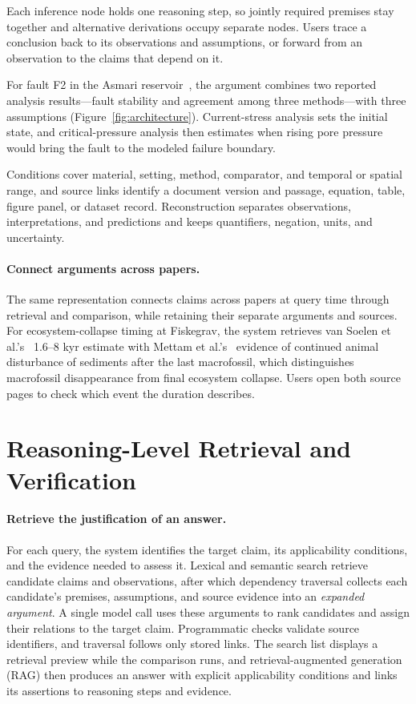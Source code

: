 \documentclass[sigconf,screen,review]{acmart}
\begin{document}
Each inference node holds one reasoning step, so jointly required premises stay together and alternative derivations occupy separate nodes. Users trace a conclusion back to its observations and assumptions, or forward from an observation to the claims that depend on it.

For fault F2 in the Asmari reservoir~\cite{asmari}, the argument combines two reported analysis results---fault stability and agreement among three methods---with three assumptions (Figure~\ref{fig:architecture}). Current-stress analysis sets the initial state, and critical-pressure analysis then estimates when rising pore pressure would bring the fault to the modeled failure boundary.

Conditions cover material, setting, method, comparator, and temporal or spatial range, and source links identify a document version and passage, equation, table, figure panel, or dataset record. Reconstruction separates observations, interpretations, and predictions and keeps quantifiers, negation, units, and uncertainty.

\paragraph{Connect arguments across papers.}
The same representation connects claims across papers at query time through retrieval and comparison, while retaining their separate arguments and sources. For ecosystem-collapse timing at Fiskegrav, the system retrieves van Soelen et al.'s~\cite{fiskegravduration} 1.6--8 kyr estimate with Mettam et al.'s~\cite{fiskegravevent} evidence of continued animal disturbance of sediments after the last macrofossil, which distinguishes macrofossil disappearance from final ecosystem collapse. Users open both source pages to check which event the duration describes.

\section{Reasoning-Level Retrieval and Verification}
\label{sec:verification}
\paragraph{Retrieve the justification of an answer.}
For each query, the system identifies the target claim, its applicability conditions, and the evidence needed to assess it. Lexical and semantic search retrieve candidate claims and observations, after which dependency traversal collects each candidate's premises, assumptions, and source evidence into an \emph{expanded argument}. A single model call uses these arguments to rank candidates and assign their relations to the target claim. Programmatic checks validate source identifiers, and traversal follows only stored links. The search list displays a retrieval preview while the comparison runs, and retrieval-augmented generation (RAG) then produces an answer with explicit applicability conditions and links its assertions to reasoning steps and evidence.
\end{document}

